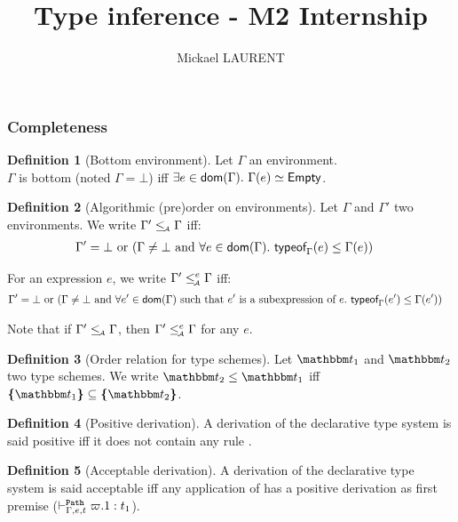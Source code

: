 \documentclass[a4paper]{article}
\title{\vspace{1.5cm}Type inference - M2 Internship}
\author{Mickael LAURENT}
\date{\vspace{-5ex}}
\theoremstyle{definition}
\newtheorem{definition}{Definition}
\begin{document}
  \maketitle

  \subsubsection{Completeness}

    \begin{definition}[Bottom environment]
      Let $\Gamma$ an environment.\\
      $\Gamma$ is bottom (noted $\Gamma = \bot$) iff $\exists e\in\dom\Gamma.\ \Gamma(e)\simeq\Empty$.
    \end{definition}

    \begin{definition}[Algorithmic (pre)order on environments]
    Let $\Gamma$ and $\Gamma'$ two environments. We write $\Gamma' \leq_{\!\scriptscriptstyle\mathcal{A}} \Gamma$ iff:
    \begin{align*}
        &\Gamma'=\bot \text{ or } (\Gamma\neq\bot \text{ and } \forall e \in \textsf{dom}(\Gamma).\ \textsf{typeof}_{\Gamma}(e) \leq \Gamma(e))
    \end{align*}

    For an expression $e$, we write $\Gamma' \leq_{\!\scriptscriptstyle\mathcal{A}}^e \Gamma$ iff:
    \begin{align*}
      &\Gamma'=\bot \text{ or } (\Gamma\neq\bot \text{ and } \forall e' \in \dom \Gamma \text{ such that $e'$ is a subexpression of $e$}.\ \tyof {e'} \Gamma \leq \Gamma({e'}))
    \end{align*}

    Note that if $\Gamma' \leq_{\!\scriptscriptstyle\mathcal{A}} \Gamma$, then $\Gamma' \leq_{\!\scriptscriptstyle\mathcal{A}}^e \Gamma$ for any $e$.
    \end{definition}

    \begin{definition}[Order relation for type schemes]
      Let $\ts_1$ and $\ts_2$ two type schemes. We write $\ts_2 \leq \ts_1$ iff $\tsint {\ts_1} \subseteq \tsint{\ts_2}$.
    \end{definition}

    \begin{definition}[Positive derivation]
      A derivation of the declarative type system is said positive iff it does not contain any rule .
    \end{definition}

    \begin{definition}[Acceptable derivation]
      A derivation of the declarative type system is said acceptable iff any application of 
      has a positive derivation as first premise ($\vdash^{\texttt{Path}}_{\Gamma,e,t} \varpi.1:t_1$).
    \end{definition}
\end{document}
